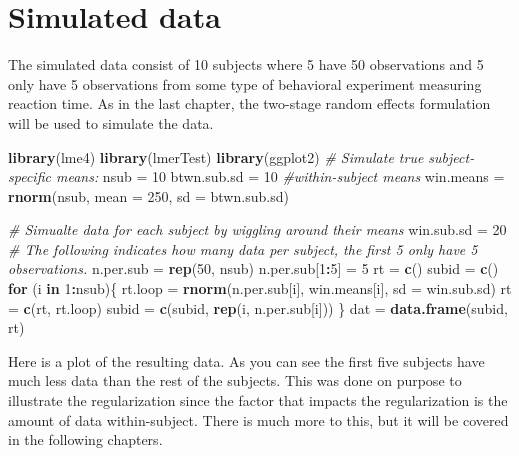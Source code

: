 \documentclass[
]{book}
\newenvironment{Shaded}{\begin{snugshade}}{\end{snugshade}}
\newcommand{\CommentTok}[1]{\textcolor[rgb]{0.56,0.35,0.01}{\textit{#1}}}
\newcommand{\ControlFlowTok}[1]{\textcolor[rgb]{0.13,0.29,0.53}{\textbf{#1}}}
\newcommand{\DataTypeTok}[1]{\textcolor[rgb]{0.13,0.29,0.53}{#1}}
\newcommand{\DecValTok}[1]{\textcolor[rgb]{0.00,0.00,0.81}{#1}}
\newcommand{\KeywordTok}[1]{\textcolor[rgb]{0.13,0.29,0.53}{\textbf{#1}}}
\newcommand{\NormalTok}[1]{#1}
\newcommand{\OperatorTok}[1]{\textcolor[rgb]{0.81,0.36,0.00}{\textbf{#1}}}
\newcommand{\StringTok}[1]{\textcolor[rgb]{0.31,0.60,0.02}{#1}}
\begin{document}
\hypertarget{simulated-data}{%
\section{Simulated data}\label{simulated-data}}

The simulated data consist of 10 subjects where 5 have 50 observations and 5 only have 5 observations from some type of behavioral experiment measuring reaction time. As in the last chapter, the two-stage random effects formulation will be used to simulate the data.

\begin{Shaded}
\begin{Highlighting}[]
\KeywordTok{library}\NormalTok{(lme4)}
\KeywordTok{library}\NormalTok{(lmerTest)}
\KeywordTok{library}\NormalTok{(ggplot2)}
\CommentTok{\# Simulate true subject{-}specific means:}
\NormalTok{nsub =}\StringTok{ }\DecValTok{10}
\NormalTok{btwn.sub.sd =}\StringTok{ }\DecValTok{10}
\CommentTok{\#within{-}subject means }
\NormalTok{win.means =}\StringTok{ }\KeywordTok{rnorm}\NormalTok{(nsub, }\DataTypeTok{mean =} \DecValTok{250}\NormalTok{, }\DataTypeTok{sd =}\NormalTok{ btwn.sub.sd)}

\CommentTok{\# Simualte data for each subject by wiggling around their means}
\NormalTok{win.sub.sd =}\StringTok{ }\DecValTok{20}
\CommentTok{\# The following indicates how many data per subject, the first 5 only have 5 observations.}
\NormalTok{n.per.sub =}\StringTok{ }\KeywordTok{rep}\NormalTok{(}\DecValTok{50}\NormalTok{, nsub)}
\NormalTok{n.per.sub[}\DecValTok{1}\OperatorTok{:}\DecValTok{5}\NormalTok{] =}\StringTok{ }\DecValTok{5}
\NormalTok{rt =}\StringTok{ }\KeywordTok{c}\NormalTok{()}
\NormalTok{subid =}\StringTok{ }\KeywordTok{c}\NormalTok{()}
\ControlFlowTok{for}\NormalTok{ (i }\ControlFlowTok{in} \DecValTok{1}\OperatorTok{:}\NormalTok{nsub)\{}
\NormalTok{  rt.loop =}\StringTok{ }\KeywordTok{rnorm}\NormalTok{(n.per.sub[i], win.means[i], }\DataTypeTok{sd =}\NormalTok{ win.sub.sd)}
\NormalTok{  rt =}\StringTok{ }\KeywordTok{c}\NormalTok{(rt, rt.loop)}
\NormalTok{  subid =}\StringTok{ }\KeywordTok{c}\NormalTok{(subid, }\KeywordTok{rep}\NormalTok{(i, n.per.sub[i]))}
\NormalTok{\}}
\NormalTok{dat =}\StringTok{ }\KeywordTok{data.frame}\NormalTok{(subid, rt)}
\end{Highlighting}
\end{Shaded}

Here is a plot of the resulting data. As you can see the first five subjects have much less data than the rest of the subjects. This was done on purpose to illustrate the regularization since the factor that impacts the regularization is the amount of data within-subject. There is much more to this, but it will be covered in the following chapters.
\end{document}
